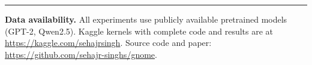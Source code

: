 \documentclass[11pt]{article}
\begin{document}
\begin{center}
\rule{0.5\textwidth}{0.5pt}
\end{center}

\textbf{Data availability.} All experiments use publicly available pretrained models (GPT-2, Qwen2.5). Kaggle kernels with complete code and results are at \url{https://kaggle.com/sehajrsingh}. Source code and paper: \url{https://github.com/sehajr-singhs/gnome}.



\end{document}
